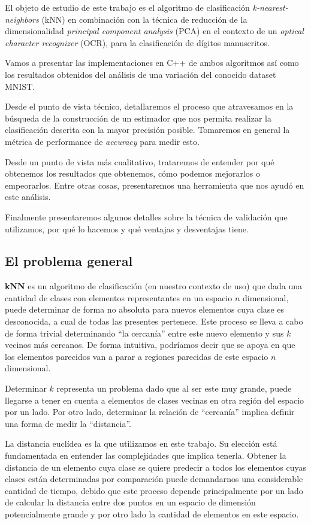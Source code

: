 El objeto de estudio de este trabajo es el algoritmo de clasificación \textit{k-nearest-neighbors} (kNN) en combinación con la técnica de reducción de la dimensionalidad \textit{principal component analysis} (PCA) en el contexto de un \textit{optical character recognizer} (OCR), para la clasificación de dígitos manuscritos.

Vamos a presentar las implementaciones en C++ de ambos algoritmos así como los resultados obtenidos del análisis de una variación del conocido dataset MNIST.

Desde el punto de vista técnico, detallaremos el proceso que atravesamos en la búsqueda de la construcción de un estimador que nos permita realizar la clasificación descrita con la mayor precisión posible. Tomaremos en general la métrica de performance de \textit{accuracy} para medir esto.

Desde un punto de vista más cualitativo, trataremos de entender por qué obtenemos los resultados que obtenemos, cómo podemos mejorarlos o empeorarlos. Entre otras cosas, presentaremos una herramienta que nos ayudó en este análisis.

Finalmente presentaremos algunos detalles sobre la técnica de validación que utilizamos, por qué lo hacemos y qué ventajas y desventajas tiene.

\subsection{El problema general}

\textbf{kNN} es un algoritmo de clasificación (en nuestro contexto de uso) que dada una cantidad de clases con elementos representantes en un espacio $n$ dimensional, puede determinar de forma no absoluta para nuevos elementos cuya clase es desconocida, a cual de todas las presentes pertenece. Este proceso se lleva a cabo de forma trivial determinando ``la cercanía'' entre este nuevo elemento y sus $k$ vecinos más cercanos. De forma intuitiva, podríamos decir que se apoya en que los elementos parecidos van a parar a regiones parecidas de este espacio $n$ dimensional.

Determinar $k$ representa un problema dado que al ser este muy grande, puede llegarse a tener en cuenta a elementos de clases vecinas en otra región del espacio por un lado. Por otro lado, determinar la relación de ``cercanía'' implica definir una forma de medir la ``distancia''.

La distancia euclídea es la que utilizamos en este trabajo. Su elección está fundamentada en entender las complejidades que implica tenerla. Obtener la distancia de un elemento cuya clase se quiere predecir a todos los elementos cuyas clases están determinadas por comparación puede demandarnos una considerable cantidad de tiempo, debido que este proceso depende principalmente por un lado de calcular la distancia entre dos puntos en un espacio de dimensión potencialmente grande y por otro lado la cantidad de elementos en este espacio.

